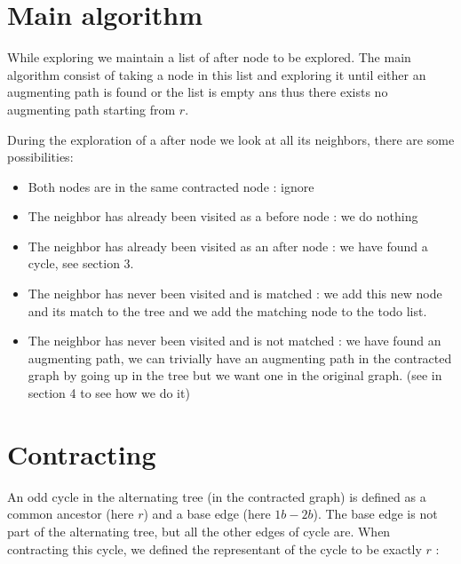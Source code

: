 \documentclass[a4paper,12pt]{article}
\renewcommand{\(}{\left(}
\renewcommand{\)}{\right)}
\begin{document}
\section{Main algorithm}

While exploring we maintain a list of after node to be explored. The main
algorithm consist of taking a node in this list and exploring it until either an
augmenting path is found or the list is empty ans thus there exists no
augmenting path starting from $r$.


During the exploration of a after node we look at all its neighbors, there are
some possibilities:
\begin{itemize}
\item Both nodes are in the same contracted node : ignore
\item The neighbor has already been visited as a before node : we do nothing
\item The neighbor has already been visited as an after node : we have found a
  cycle, see section 3.
\item The neighbor has never been visited and is matched : we add this new node
  and its match to the tree and we add the matching node to the todo list.
\item The neighbor has never been visited and is not matched : we have found an
  augmenting path, we can trivially have an augmenting path in the contracted
  graph by going up in the tree but we want one in the original graph. (see in
  section 4 to see how we do it)
\end{itemize}



\section{Contracting}

An odd cycle in the alternating tree (in the contracted graph) is defined as a
common ancestor (here $r$) and a base edge (here $1b - 2b$). The base edge is
not part of the alternating tree, but all the other edges of cycle are.
When contracting this cycle, we defined the representant of the cycle to be
exactly $r$ :
\begin{center}
\end{center}
\end{document}
